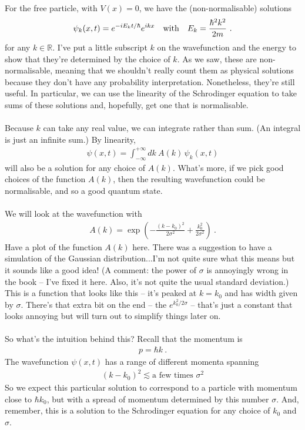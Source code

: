 \documentclass[12pt]{article}
\def\be{\begin{eqnarray}}
\def\ee{\end{eqnarray}}
\newcommand{\nn}{\nonumber}
\newcommand\para{\paragraph{}}
\newcommand{\R}{{\mathds R}}
\begin{document}
\para
{\color{olive} For the free particle, with $V(x)=0$, we have the (non-normalisable) solutions 
%
\be \psi_k(x,t) = e^{-iE_kt/\hbar} e^{ikx} \ \ \ {\rm with}\ \ \ E_k=\frac{\hbar^2k^2}{2m}\ .\ee
%
for any $k\in \R$.} I've put a little subscript $k$ on the wavefunction and the energy to show that they're determined by the choice of $k$. As we saw, these are non-normalisable, meaning that we shouldn't really count them as physical solutions because they don't have any probability interpretation. Nonetheless, they're still useful. In particular, we can use the linearity of the Schrodinger equation to take sums of these solutions and, hopefully, get one that is normalisable.

\para
Because $k$ can take any real value, we can integrate rather than sum. (An integral is just an infinite sum.) {\color{olive} By linearity,
%
\be \psi(x,t) = \int_{-\infty}^{+\infty} dk\ A(k) \,\psi_k(x,t)\nn\ee
%
will also be a solution for any choice of $A(k)$.} What's more, if we pick good choices of the function $A(k)$, then the resulting wavefunction could be normalisable, and so a good quantum state. 

\para
{\color{olive} We will look at the wavefunction with
%
\be A(k) = \exp\left(-\frac{(k-k_0)^2}{2\sigma^2} +\frac{k_0^2}{2\sigma^2}\right)\ .\ee
%
} {\color{blue} Have a plot of the function $A(k)$ here. There was a suggestion to have a simulation of the Gaussian distribution...I'm not quite sure what this means but it sounds like a good idea! (A comment: the power of $\sigma$ is annoyingly wrong in the book -- I've fixed it here. Also, it's not quite the usual standard deviation.)} This is a function that looks like this -- it's peaked at $k=k_0$ and has width given by $\sigma$. There's that extra bit on the end -- the $e^{k_0^2/2\sigma}$ -- that's just a constant that looks annoying but will turn out to simplify things later on.

\para
So what's the intuition behind this? {\color{olive} Recall that the momentum is 
%
\be p = \hbar k\ .\ee
%
The wavefunction $\psi(x,t)$ has a range of different momenta spanning 
%
\be  (k-k_0)^2 \lesssim \mbox{a few times $\sigma^2$}\nn\ee
%
} So we expect this particular solution to correspond to a particle with momentum close to $\hbar k_0$, but with a spread of momentum determined by this number $\sigma$. And, remember, this is a solution to the Schrodinger equation for any choice of $k_0$ and $\sigma$. 
\end{document}
